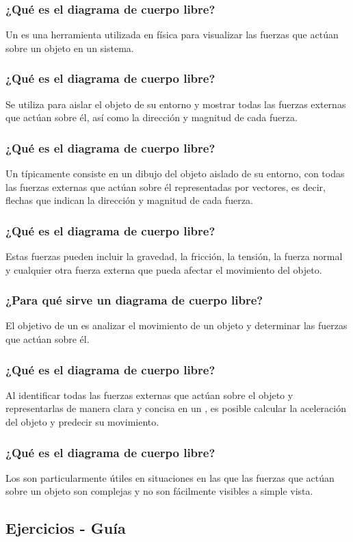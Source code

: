 \documentclass[12pt]{beamer}
\begin{document}
\begin{frame}
\frametitle{¿Qué es el diagrama de cuerpo libre?}
Un  es una herramienta utilizada en física para visualizar las fuerzas que actúan sobre un objeto en un sistema.
\end{frame}
\begin{frame}
\frametitle{¿Qué es el diagrama de cuerpo libre?}
Se utiliza para aislar el objeto de su entorno y mostrar todas las fuerzas externas que actúan sobre él, así como la dirección y magnitud de cada fuerza.
\end{frame}
\begin{frame}
\frametitle{¿Qué es el diagrama de cuerpo libre?}
Un  típicamente consiste en un dibujo del objeto aislado de su entorno, con todas las fuerzas externas que actúan sobre él representadas por vectores, es decir, flechas que indican la dirección y magnitud de cada fuerza.
\end{frame}
\begin{frame}
\frametitle{¿Qué es el diagrama de cuerpo libre?}
Estas fuerzas pueden incluir la gravedad, la fricción, la tensión, la fuerza normal y cualquier otra fuerza externa que pueda afectar el movimiento del objeto.
\end{frame}
\begin{frame}
\frametitle{¿Para qué sirve un diagrama de cuerpo libre?}
El objetivo de un  es analizar el movimiento de un objeto y determinar las fuerzas que actúan sobre él.
\end{frame}
\begin{frame}
\frametitle{¿Qué es el diagrama de cuerpo libre?}
Al identificar todas las fuerzas externas que actúan sobre el objeto y representarlas de manera clara y concisa en un , es posible calcular la aceleración del objeto y predecir su movimiento.
\end{frame}
\begin{frame}
\frametitle{¿Qué es el diagrama de cuerpo libre?}
Los  son particularmente útiles en situaciones en las que las fuerzas que actúan sobre un objeto son complejas y no son fácilmente visibles a simple vista. 
\end{frame}


\subsection{Ejercicios - Guía}
\end{document}
